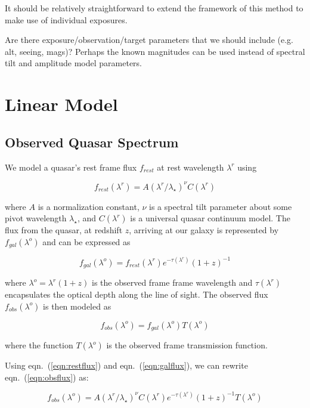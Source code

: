 \documentclass[oneside,10pt]{article}
\providecommand{\eqn}[1]{eqn.~(\ref{eqn:#1})}
\providecommand{\lambdaobs}{\lambda^o}
\providecommand{\lambdarest}{\lambda^r}
\begin{document}
It should be relatively straightforward to extend the framework of this method to make use of individual exposures. 

Are there exposure/observation/target parameters that we should include (e.g. alt, seeing, mags)? Perhaps the known 
magnitudes can be used instead of spectral tilt and amplitude model parameters.

\section{Linear Model}

\subsection{Observed Quasar Spectrum}

We model a quasar's rest frame flux $f_{rest}$ at rest wavelength $\lambdarest$ using

\begin{equation}
f_{rest}(\lambdarest) = A \left(\lambdarest/\lambda_{\star}\right)^{\nu} C(\lambdarest)
\label{eqn:restflux}
\end{equation}

where $A$ is a normalization constant, $\nu$ is a spectral tilt parameter about some pivot wavelength $\lambda_\star$, 
and $C(\lambdarest)$ is a universal quasar continuum model. The flux from the quasar, at redshift $z$, arriving at our galaxy
 is represented by $ f_{gal}(\lambdaobs)$ and can be expressed as

\begin{equation}
f_{gal}(\lambdaobs) = f_{rest}(\lambdarest) e^{-\tau(\lambdarest)} (1+z)^{-1}
\label{eqn:galflux}
\end{equation}

where $\lambdaobs = \lambdarest(1+z)$ is the observed frame frame wavelength and $\tau(\lambdarest)$ encapsulates the 
optical depth along the line of sight. The observed flux $f_{obs}(\lambdaobs)$ is then modeled as

\begin{equation}
f_{obs}(\lambdaobs) = f_{gal}(\lambdaobs) T(\lambdaobs)
\label{eqn:obsflux}
\end{equation}

where the function $T(\lambdaobs)$ is the observed frame transmission function. 

Using \eqn{restflux} and \eqn{galflux}, we can rewrite \eqn{obsflux} as:

\begin{equation}
f_{obs}(\lambdaobs) = A \left(\lambdarest/\lambda_{\star}\right)^{\nu} C(\lambdarest) e^{-\tau(\lambdarest)} (1+z)^{-1} T(\lambdaobs) 
\label{eqn:fluxmodel}
\end{equation}
\end{document}
